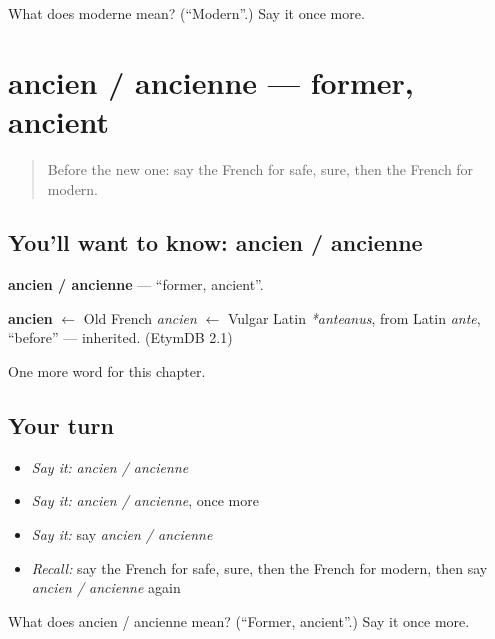 \begin{tcolorbox}[breakable,colback=teal!4,colframe=teal!35!black,title={Before you move on}]
What does moderne mean? (\textquotedblleft{}Modern\textquotedblright{}.) Say it once more.
\end{tcolorbox}
\section[ancien / ancienne]{ancien / ancienne — former, ancient}

\label{lesson:FR-C161-ancien-ancienne}



\begin{quote}
Before the new one: say the French for safe, sure, then the French for modern.
\end{quote}

\subsection*{You'll want to know: ancien / ancienne}
\textbf{ancien / ancienne} — \textquotedblleft{}former, ancient\textquotedblright{}.

\begin{cousinweb}
\textbf{ancien} $\leftarrow$ Old French \emph{ancien} $\leftarrow$ Vulgar Latin \emph{*anteanus}, from Latin \emph{ante}, \textquotedblleft{}before\textquotedblright{} — inherited. (EtymDB 2.1)
\end{cousinweb}

\begin{grammarlens}[title={What you've built}]
One more word for this chapter.
\end{grammarlens}

\subsection*{Your turn}
\begin{itemize}
\raggedright
  \item \emph{Say it:} \emph{ancien / ancienne}
  \item \emph{Say it:} \emph{ancien / ancienne}, once more
  \item \emph{Say it:} say \emph{ancien / ancienne}
  \item \emph{Recall:} say the French for safe, sure, then the French for modern, then say \emph{ancien / ancienne} again
\end{itemize}

\begin{tcolorbox}[breakable,colback=teal!4,colframe=teal!35!black,title={Before you move on}]
What does ancien / ancienne mean? (\textquotedblleft{}Former, ancient\textquotedblright{}.) Say it once more.
\end{tcolorbox}

